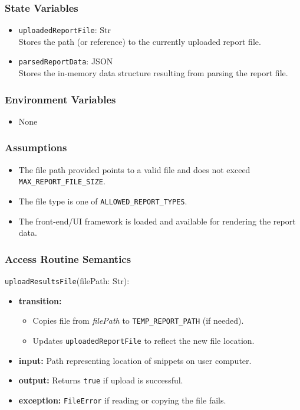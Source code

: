 \documentclass[12pt, titlepage]{article}
\begin{document}
\subsubsection{State Variables}

\begin{itemize}
    \item \texttt{uploadedReportFile}: Str \\
    Stores the path (or reference) to the currently uploaded report file.
    \item \texttt{parsedReportData}: JSON \\
     Stores the in-memory data structure resulting from parsing the report file.
\end{itemize}

\subsubsection{Environment Variables}

\begin{itemize}
    \item None
\end{itemize}

\subsubsection{Assumptions}

\begin{itemize}
    \item The file path provided points to a valid file and does not exceed \texttt{MAX\_REPORT\_FILE\_SIZE}.
    \item The file type is one of \texttt{ALLOWED\_REPORT\_TYPES}.
    \item The front-end/UI framework is loaded and available for rendering the report data.
\end{itemize}

\subsubsection{Access Routine Semantics}

\noindent \texttt{uploadResultsFile}(filePath: Str):
\begin{itemize}
    \item \textbf{transition:}
    \begin{itemize}
        \item Copies file from \textit{filePath} to \texttt{TEMP\_REPORT\_PATH} (if needed).
        \item Updates \texttt{uploadedReportFile} to reflect the new file location.
    \end{itemize}
    \item \textbf{input:} Path representing location of snippets on user computer.
    \item \textbf{output:} Returns \texttt{true} if upload is successful.
    \item \textbf{exception:} \texttt{FileError} if reading or copying the file fails.
\end{itemize}
\end{document}
